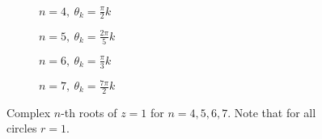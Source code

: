 \begin{figure}
	\captionsetup[subfigure]{labelformat=empty}
	\centering
	\begin{subfigure}[b]{0.475\textwidth}
		\centering
		\caption{$n=4,\ \theta_{k}=\frac{\pi}{2}k$}
	\end{subfigure}
	\hfill
	\begin{subfigure}[b]{0.475\textwidth}
		\centering
		\caption{$n=5,\ \theta_{k}=\frac{2\pi}{5}k$}
	\end{subfigure}

	\vspace{2em}
	\begin{subfigure}[b]{0.475\textwidth}
		\centering
		\caption{$n=6,\ \theta_{k}=\frac{\pi}{3}k$}
	\end{subfigure}
	\hfill
	\begin{subfigure}[b]{0.475\textwidth}
		\centering
		\caption{$n=7,\ \theta_{k}=\frac{7\pi}{2}k$}
	\end{subfigure}
	\caption{Complex $n$-th roots of $z=1$ for $n=4,5,6,7$. Note that for all circles $r=1$.}
	\label{fig:nth roots of 1}
\end{figure}
